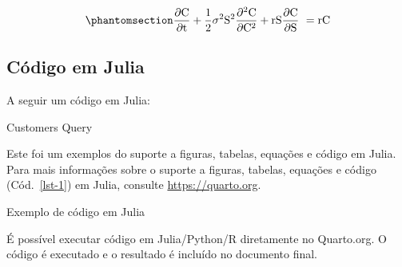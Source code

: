 \documentclass[
  12pt,
  oneside,
  a4paper,
  english,
  brazil]{abntex2}
\newenvironment{Shaded}{}{}
\newcommand{\FloatTok}[1]{\textcolor[rgb]{0.00,0.36,0.77}{#1}}
\newcommand{\NormalTok}[1]{\textcolor[rgb]{0.14,0.16,0.18}{#1}}
\newcommand{\OperatorTok}[1]{\textcolor[rgb]{0.14,0.16,0.18}{#1}}
\begin{document}
\begin{equation}\phantomsection\label{eq-black-scholes}{
\frac{\partial \mathrm C}{ \partial \mathrm t } + \frac{1}{2}\sigma^{2} \mathrm S^{2}
\frac{\partial^{2} \mathrm C}{\partial \mathrm C^2}
  + \mathrm r \mathrm S \frac{\partial \mathrm C}{\partial \mathrm S}\ =
  \mathrm r \mathrm C 
}\end{equation}

\subsection{Código em Julia}\label{cuxf3digo-em-julia}

A seguir um código em Julia:

\vspace{0cm}

\begin{codelisting}

\caption{\label{lst-1}Customers Query}

\centering{

\begin{Shaded}
\begin{Highlighting}[]
\NormalTok{x }\OperatorTok{=} \FloatTok{1} \OperatorTok{+} \FloatTok{1}
\end{Highlighting}
\end{Shaded}

}

\end{codelisting}%

Este foi um exemplos do suporte a figuras, tabelas, equações e código em
Julia. Para mais informações sobre o suporte a figuras, tabelas,
equações e código (Cód.~\ref{lst-1}) em Julia, consulte
\url{https://quarto.org}.

\begin{codelisting}

\caption{\label{lst-2}Exemplo de código em Julia}

\centering{

\begin{Shaded}
\begin{Highlighting}[]
\NormalTok{x }\OperatorTok{=} \FloatTok{1} \OperatorTok{+} \FloatTok{1}
\end{Highlighting}
\end{Shaded}

}

\end{codelisting}%

É possível executar código em Julia/Python/R diretamente no Quarto.org.
O código é executado e o resultado é incluído no documento final.
\end{document}
